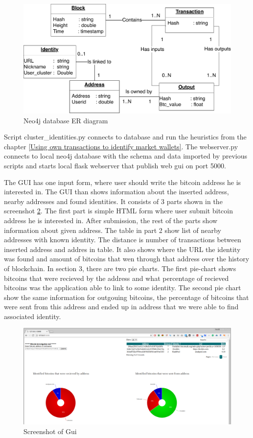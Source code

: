 \documentclass[
  digital, %
  table,   %
  lof,     %
  lot,     %
  oneside
]{fithesis3}
\begin{document}
\begin{figure}[!htb]
    \centering
    \includegraphics[width=1\textwidth]{neo4j-schema}
    \caption{Neo4j database ER diagram}
    \label{neo4jschema}
\end{figure}

Script cluster\_identities.py connects to database and run the heuristics from the chapter
\ref{Using own transactions to identify market wallets}.
The webserver.py connects to local neo4j database with the schema and data imported by previous
scripts and starts local flask webserver that publish web gui on port 5000.

The GUI has one input form, where user should write the bitcoin address he is interested in.
The GUI than shows information about the inserted address, nearby addresses and found identities.
It consists of 3 parts shown in the screenshot \ref{guiscreen}.
The first part is simple HTML form where user submit bitcoin address he is interested in.
After submission, the rest of the parts show information about given address.
The table in part 2 show list of nearby addresses with known identity. The distance is number of transactions
between inserted address and addres in table. It also shows where the URL the identity was found
and amount of bitcoins that wen through that address over the history of blockchain.
In section 3, there are two pie charts. The first pie-chart shows bitcoins that were recieved by the address
and what percentage of recieved bitcoins was the application able to link to some identity.
The second pie chart show the same information for outgouing bitcoins, the percentage of bitcoins that were sent from this address
and ended up in address that we were able to find associated identity.

\begin{figure}[!htb]
    \centering
    \includegraphics[width=1\textwidth]{shot}
    \caption{Screenshot of Gui}
    \label{guiscreen}
\end{figure}
\end{document}
